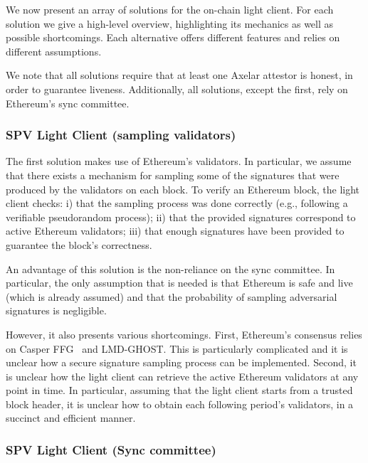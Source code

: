 
We now present an array of solutions for the on-chain light client. For each
solution we give a high-level overview, highlighting its mechanics as well as
possible shortcomings. Each alternative offers different features and relies on
different assumptions. 

We note that all solutions require that at least one Axelar attestor is honest,
in order to guarantee liveness. Additionally, all solutions, except the first,
rely on Ethereum's sync committee.

\subsubsection{SPV Light Client (sampling validators)}

The first solution makes use of Ethereum's validators. In particular, we assume
that there exists a mechanism for sampling some of the signatures that were
produced by the validators on each block. To verify an Ethereum block, the
light client checks:
i) that the sampling process was done correctly (e.g., following a verifiable pseudorandom process);
ii) that the provided signatures correspond to active Ethereum validators;
iii) that enough signatures have been provided to guarantee the block's correctness.

An advantage of this solution is the non-reliance on the sync committee. In
particular, the only assumption that is needed is that Ethereum is safe and
live (which is already assumed) and that the probability of sampling
adversarial signatures is negligible.

However, it also presents various shortcomings.
First, Ethereum's consensus relies on Casper FFG~\cite{buterin2017casper} and
LMD-GHOST. This is particularly complicated and it is unclear how a secure
signature sampling process can be implemented.
Second, it is unclear how the light client can retrieve the active Ethereum
validators at any point in time. In particular, assuming that the light client
starts from a trusted block header, it is unclear how to obtain each following
period's validators, in a succinct and efficient manner.

\subsubsection{SPV Light Client (Sync committee)}

